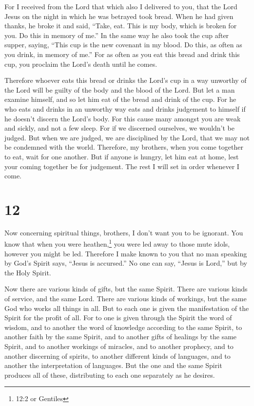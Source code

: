  For I received from the Lord that which also I delivered
to you, that the Lord Jesus on the night in which he was betrayed took
bread.  When he had given thanks, he broke it and said,
``Take, eat. This is my body, which is broken for you. Do this in memory
of me.''  In the same way he also took the cup after
supper, saying, ``This cup is the new covenant in my blood. Do this, as
often as you drink, in memory of me.''  For as often as you
eat this bread and drink this cup, you proclaim the Lord's death until
he comes.

 Therefore whoever eats this bread or drinks the Lord's cup
in a way unworthy of the Lord will be guilty of the body and the blood
of the Lord.  But let a man examine himself, and so let him
eat of the bread and drink of the cup.  For he who eats and
drinks in an unworthy way eats and drinks judgement to himself if he
doesn't discern the Lord's body.  For this cause many
amongst you are weak and sickly, and not a few sleep.  For
if we discerned ourselves, we wouldn't be judged.  But when
we are judged, we are disciplined by the Lord, that we may not be
condemned with the world.  Therefore, my brothers, when you
come together to eat, wait for one another.  But if anyone
is hungry, let him eat at home, lest your coming together be for
judgement. The rest I will set in order whenever I come.

\hypertarget{section-11}{%
\section{12}\label{section-11}}

 Now concerning spiritual things, brothers, I don't want you
to be ignorant.  You know that when you were
heathen,\footnote{12:2 or Gentiles} you were led away to those mute
idols, however you might be led.  Therefore I make known to
you that no man speaking by God's Spirit says, ``Jesus is accursed.'' No
one can say, ``Jesus is Lord,'' but by the Holy Spirit.

 Now there are various kinds of gifts, but the same Spirit.
 There are various kinds of service, and the same Lord.
 There are various kinds of workings, but the same God who
works all things in all.  But to each one is given the
manifestation of the Spirit for the profit of all.  For to
one is given through the Spirit the word of wisdom, and to another the
word of knowledge according to the same Spirit,  to another
faith by the same Spirit, and to another gifts of healings by the same
Spirit,  and to another workings of miracles, and to
another prophecy, and to another discerning of spirits, to another
different kinds of languages, and to another the interpretation of
languages.  But the one and the same Spirit produces all of
these, distributing to each one separately as he desires.


